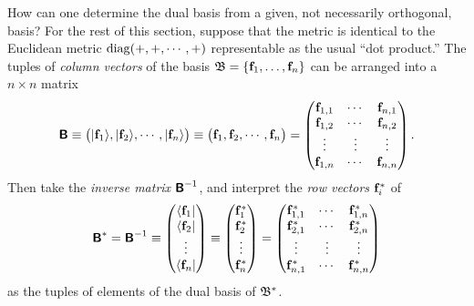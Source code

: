 
How can one determine the dual basis from a given,
not necessarily orthogonal, basis?
For the rest of this section, suppose that the metric is identical to the Euclidean metric ${\rm diag}(+,+,\cdots ,+)$ representable as the usual ``dot product.''
The tuples of {\em column vectors} of the basis ${\frak B} = \{{\bf f}_1,\ldots , {\bf f}_n\}$
can be arranged into a $n \times n$ matrix
\begin{equation}
\textsf{\textbf{B}}
\equiv
\begin{pmatrix} \vert {\bf f}_{1} \rangle , \vert {\bf f}_{2}\rangle , \cdots ,\vert  {\bf f}_{n}\rangle \end{pmatrix}
\equiv
\begin{pmatrix} {\bf f}_{1} , {\bf f}_{2}, \cdots , {\bf f}_{n} \end{pmatrix}
=
\begin{pmatrix}
{\bf f}_{1,1}&\cdots & {\bf f}_{n,1}\\
{\bf f}_{1,2}&\cdots & {\bf f}_{n,2}\\
\vdots&\vdots & \vdots \\
{\bf f}_{1,n}&\cdots & {\bf f}_{n,n}
\end{pmatrix}
.
\end{equation}
Then take the
{\em inverse matrix}
$\textsf{\textbf{B}}^{-1}$,
and interpret the
{\em row vectors} ${\bf f}_{i}^\ast$ of
\begin{equation}
\begin{split}
\textsf{\textbf{B}}^{\ast}=\textsf{\textbf{B}}^{-1}
\equiv
\begin{pmatrix}
\langle {\bf f}_{1} \vert \\
\langle {\bf f}_{2} \vert \\
                      \vdots  \\
\langle {\bf f}_{n} \vert
\end{pmatrix}
\equiv
\begin{pmatrix}
{\bf f}_{1}^\ast\\
{\bf f}_{2}^\ast\\
\vdots  \\
{\bf f}_{n}^\ast
\end{pmatrix}
=
\begin{pmatrix}
{\bf f}_{1,1}^\ast&\cdots & {\bf f}_{1,n}^\ast\\
{\bf f}_{2,1}^\ast&\cdots & {\bf f}_{2,n}^\ast\\
\vdots&\vdots & \vdots \\
{\bf f}_{n,1}^\ast&\cdots & {\bf f}_{n,n}^\ast
\end{pmatrix}
\end{split}
\end{equation}
as the tuples of elements of the dual basis of ${\frak B}^\ast $.


